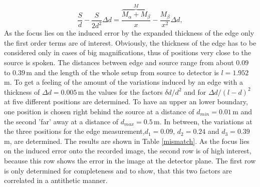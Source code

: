 \begin{equation}
\frac{S}{d} -\frac{S}{2d^{2}}\Delta d = \frac{\overbrace{M_{\alpha}+M_{\beta}}^{M}}{x} - \frac{M_{\beta}}{x^{2}}\Delta d,
\end{equation}
As the focus lies on the induced error by the expanded thickness of the edge only the first order terms are of interest. Obviously, the thickness of the edge has to be considered only in cases of big magnifications, thus of positions very close to the source is spoken. The distances between edge and source range from about $0.09$ to $0.39\,$m and the length of the whole setup from source to detector is $l = 1.952\,$m. To get a feeling of the amount of the variations induced by an edge with a thickness of $\Delta d = 0.005\,$m the values for the factors $\delta d/d^{2}$ and for $\Delta d/(l-d)^{2}$ at five different positions are determined. To have an upper an lower boundary, one position is chosen right behind the source at a distance of $d_{min} = 0.01\,$m and the second 'far' away at a distance of $d_{max}= 0.5\,$m. In between, the variations at the three positions for the edge measurement,$ d_{1} = 0.09$, $d_{2}= 0.24$ and $d_{3} = 0.39\,$m, are determined. The results are shown in Table \ref{mismatch}. As the focus lies on the induced error onto the recorded image, the second row is of high interest, because this row shows the error in the image at the detector plane. The first row is only determined for completeness and to show, that this two factors are correlated in a antithetic manner.
